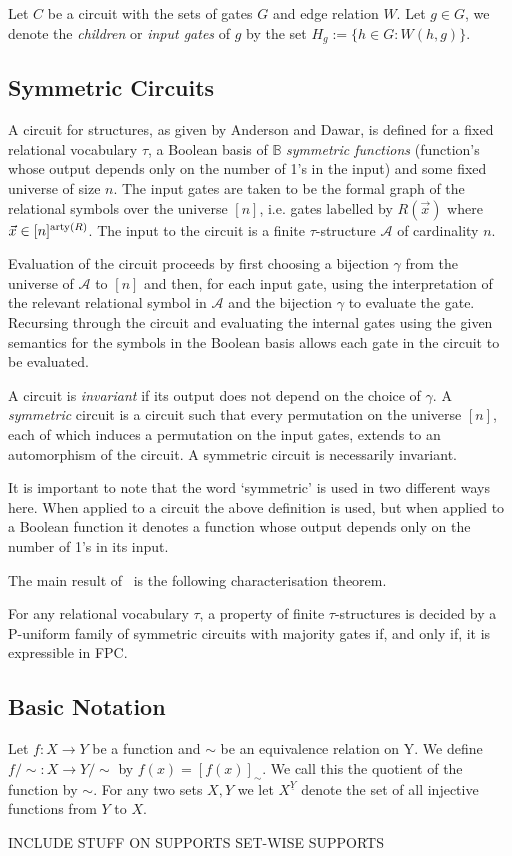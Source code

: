 \documentclass[../paper.tex]{subfiles}
\begin{document}
Let $C$ be a circuit with the sets of gates $G$ and edge relation $W$. Let $g
\in G$, we denote the \emph{children} or \emph{input gates} of $g$ by the set
$H_g := \{h \in G : W(h,g)\}$.

\subsection{Symmetric Circuits}
A circuit for structures, as given by Anderson and Dawar, is defined for a fixed
relational vocabulary $\tau$, a Boolean basis of $\mathbb{B}$ \emph{symmetric
  functions} (function's whose output depends only on the number of 1's in the
input) and some fixed universe of size $n$. The input gates are taken to be the
formal graph of the relational symbols over the universe $[n]$, i.e. gates
labelled by $R(\vec{x})$ where $\vec{x} \in [n]^{\mathrm{arty}(R)}$. The input to the
circuit is a finite $\tau$-structure $\mathcal{A}$ of cardinality $n$.

Evaluation of the circuit proceeds by first choosing a bijection $\gamma$ from
the universe of $\mathcal{A}$ to $[n]$ and then, for each input gate, using the
interpretation of the relevant relational symbol in $\mathcal{A}$ and the
bijection $\gamma$ to evaluate the gate. Recursing through the circuit and
evaluating the internal gates using the given semantics for the symbols in the
Boolean basis allows each gate in the circuit to be evaluated.

A circuit is \emph{invariant} if its output does not depend on the choice of
$\gamma$. A \emph{symmetric} circuit is a circuit such that every permutation on
the universe $[n]$, each of which induces a permutation on the input gates,
extends to an automorphism of the circuit. A symmetric circuit is necessarily
invariant.

It is important to note that the word `symmetric' is used in two different ways
here. When applied to a circuit the above definition is used, but when applied
to a Boolean function it denotes a function whose output depends only on the
number of 1's in its input.

The main result of~\cite{AndersonD17} is the following characterisation theorem.

\begin{thm}
  For any relational vocabulary $\tau$, a property of finite $\tau$-structures
  is decided by a P-uniform family of symmetric circuits with majority gates if,
  and only if, it is expressible in FPC.
\end{thm}

\subsection{Basic Notation}

Let $f : X \rightarrow Y$ be a function and $\sim$ be an equivalence relation on
Y. We define $f/{\sim} : X \rightarrow Y/{\sim}$ by $f(x) = [f(x)]_{\sim}$. We
call this the quotient of the function by $\sim$. For any two sets $X, Y$ we let
$X^{\underline{Y}}$ denote the set of all injective functions from $Y$ to $X$.

INCLUDE STUFF ON SUPPORTS SET-WISE SUPPORTS
\end{document}
